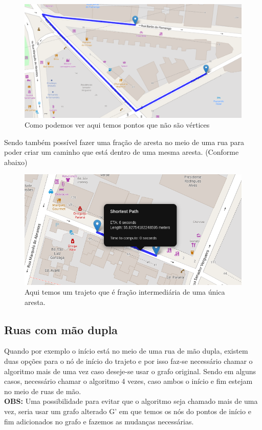 \documentclass{article}
\begin{document}
\begin{figure}[H]
    \centering
    \includegraphics[scale=0.43]{EDA_fraction_edge.png}
    \caption{Como podemos ver aqui temos pontos que não são vértices}
    \label{fig:my_label}
\end{figure}

Sendo também possível fazer uma fração de aresta no meio de uma rua para poder criar um caminho que está dentro de uma mesma aresta. (Conforme abaixo)

\begin{figure}[H]
    \centering
    \includegraphics[scale=0.7]{EDA_same_street_special_case.png}
    \caption{Aqui temos um trajeto que é fração intermediária de uma única aresta.}
    \label{fig:my_label}
\end{figure}

\subsection{Ruas com mão dupla}
Quando por exemplo o início está no meio de uma rua de mão dupla, existem duas opções para o nó de início do trajeto e por isso faz-se necessário chamar o algoritmo mais de uma vez caso deseje-se usar o grafo original. Sendo em alguns casos, necessário chamar o algoritmo 4 vezes, caso ambos o início e fim estejam no meio de ruas de mão.\\
\textbf{OBS:} Uma possibilidade para evitar que o algoritmo seja chamado mais de uma vez, seria usar um grafo alterado G' em que temos os nós do pontos de início e fim adicionados no grafo e fazemos as mudanças necessárias.\\
\end{document}
